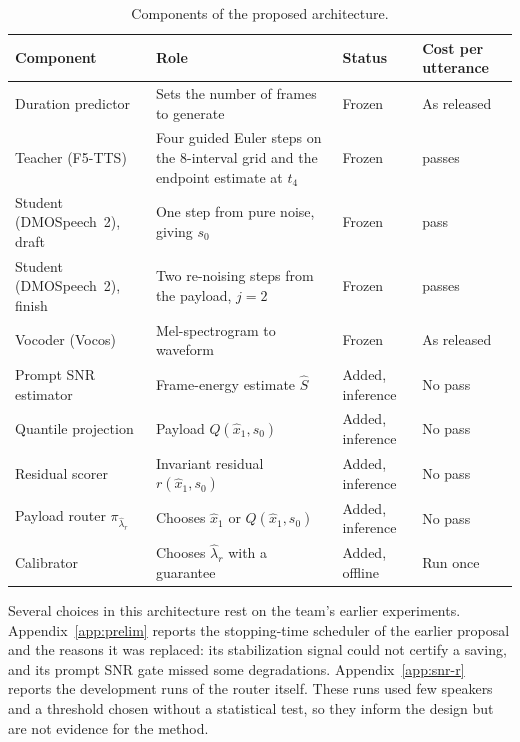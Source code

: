 \begin{table}[!htbp]
\centering\small
\caption{Components of the proposed architecture.}
\label{tab:components}
\begin{tabularx}{\textwidth}{@{}>{\raggedright\arraybackslash}p{3.1cm} >{\raggedright\arraybackslash}X >{\raggedright\arraybackslash}p{2.3cm} >{\raggedright\arraybackslash}p{2.5cm}@{}}
\toprule
\textbf{Component} & \textbf{Role} & \textbf{Status} & \textbf{Cost per utterance} \\
\midrule
Duration predictor & Sets the number of frames to generate & Frozen & As released \\
Teacher (F5-TTS) & Four guided Euler steps on the 8-interval grid and the endpoint estimate at $t_4$ & Frozen & 10 passes \\
Student (DMOSpeech~2), draft & One step from pure noise, giving $s_0$ & Frozen & 1 pass \\
Student (DMOSpeech~2), finish & Two re-noising steps from the payload, $j=2$ & Frozen & 2 passes \\
Vocoder (Vocos) & Mel-spectrogram to waveform & Frozen & As released \\
Prompt SNR estimator & Frame-energy estimate $\hat S$ & Added, inference & No pass \\
Quantile projection & Payload $Q(\hat x_1,s_0)$ & Added, inference & No pass \\
Residual scorer & Invariant residual $r(\hat x_1,s_0)$ & Added, inference & No pass \\
Payload router $\pi_{\hat\lambda_r}$ & Chooses $\hat x_1$ or $Q(\hat x_1,s_0)$ & Added, inference & No pass \\
Calibrator & Chooses $\hat\lambda_r$ with a guarantee & Added, offline & Run once \\
\bottomrule
\end{tabularx}
\end{table}

Several choices in this architecture rest on the team's earlier experiments. Appendix~\ref{app:prelim} reports the stopping-time scheduler of the earlier proposal and the reasons it was replaced: its stabilization signal could not certify a saving, and its prompt SNR gate missed some degradations. Appendix~\ref{app:snr-r} reports the development runs of the router itself. These runs used few speakers and a threshold chosen without a statistical test, so they inform the design but are not evidence for the method.

